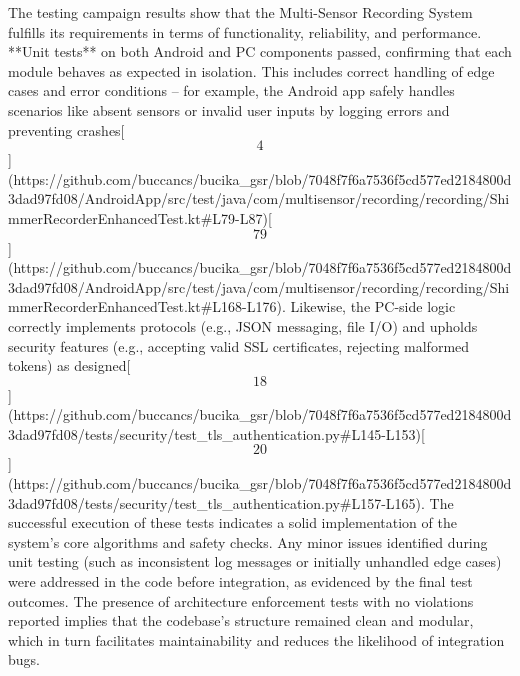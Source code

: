 \documentclass[12pt,a4paper]{article}
\begin{document}
{The testing campaign results show that the Multi-Sensor Recording System
fulfills its requirements in terms of functionality, reliability, and
performance. **Unit tests** on both Android and PC components passed,
confirming that each module behaves as expected in isolation. This
includes correct handling of edge cases and error conditions -- for
example, the Android app safely handles scenarios like absent sensors or
invalid user inputs by logging errors and preventing
crashes[\[4\]](https://github.com/buccancs/bucika_gsr/blob/7048f7f6a7536f5cd577ed2184800d3dad97fd08/AndroidApp/src/test/java/com/multisensor/recording/recording/ShimmerRecorderEnhancedTest.kt#L79-L87)[\[79\]](https://github.com/buccancs/bucika_gsr/blob/7048f7f6a7536f5cd577ed2184800d3dad97fd08/AndroidApp/src/test/java/com/multisensor/recording/recording/ShimmerRecorderEnhancedTest.kt#L168-L176).
Likewise, the PC-side logic correctly implements protocols (e.g., JSON
messaging, file I/O) and upholds security features (e.g., accepting
valid SSL certificates, rejecting malformed tokens) as
designed[\[18\]](https://github.com/buccancs/bucika_gsr/blob/7048f7f6a7536f5cd577ed2184800d3dad97fd08/tests/security/test_tls_authentication.py#L145-L153)[\[20\]](https://github.com/buccancs/bucika_gsr/blob/7048f7f6a7536f5cd577ed2184800d3dad97fd08/tests/security/test_tls_authentication.py#L157-L165).
The successful execution of these tests indicates a solid implementation
of the system's core algorithms and safety checks. Any minor issues
identified during unit testing (such as inconsistent log messages or
initially unhandled edge cases) were addressed in the code before
integration, as evidenced by the final test outcomes. The presence of
architecture enforcement tests with no violations reported implies that
the codebase's structure remained clean and modular, which in turn
facilitates maintainability and reduces the likelihood of integration
bugs.

}
\end{document}
